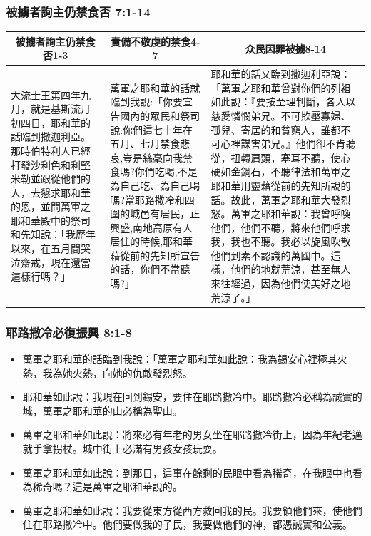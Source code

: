 \subsubsection{被擄者詢主仍禁食否 7:1-14}
\begin{table}[H]
\centering
\begin{tabular}{p{4.25cm}|p{4.55cm}|p{8.2cm}}\hline\hline
\multicolumn{1}{c|}{被擄者詢主仍禁食否1-3}&\multicolumn{1}{c|}{責備不敬虔的禁食4-7}&\multicolumn{1}{c}{众民因罪被擄8-14}\\\hline
大流士王第四年九月，就是基斯流月初四日，耶和華的話臨到撒迦利亞。那時伯特利人已經打發沙利色和利堅米勒並跟從他們的人，去懇求耶和華的恩，並問萬軍之耶和華殿中的祭司和先知說：「我歷年以來，在五月間哭泣齋戒，現在還當這樣行嗎？」
&萬軍之耶和華的話就臨到我說:「你要宣告國內的眾民和祭司說:你們這七十年在五月、七月禁食悲哀,豈是絲毫向我禁食嗎?你們吃喝,不是為自己吃、為自己喝嗎?當耶路撒冷和四圍的城邑有居民，正興盛,南地高原有人居住的時候,耶和華藉從前的先知所宣告的話，你們不當聽嗎?」
&耶和華的話又臨到撒迦利亞說：「萬軍之耶和華曾對你們的列祖如此說：『要按至理判斷，各人以慈愛憐憫弟兄。不可欺壓寡婦、孤兒、寄居的和貧窮人，誰都不可心裡謀害弟兄。』他們卻不肯聽從，扭轉肩頭，塞耳不聽，使心硬如金鋼石，不聽律法和萬軍之耶和華用靈藉從前的先知所說的話。故此，萬軍之耶和華大發烈怒。萬軍之耶和華說：我曾呼喚他們，他們不聽，將來他們呼求我，我也不聽。我必以旋風吹散他們到素不認識的萬國中。這樣，他們的地就荒涼，甚至無人來往經過，因為他們使美好之地荒涼了。」\\\hline
\end{tabular}
\end{table}


\subsubsection{耶路撒冷必復振興 8:1-8}
\begin{itemize} 
\itemsep-.5em 
\item 萬軍之耶和華的話臨到我說：「萬軍之耶和華如此說：我為錫安心裡極其火熱，我為她火熱，向她的仇敵發烈怒。
\item 耶和華如此說：我現在回到錫安，要住在耶路撒冷中。耶路撒冷必稱為誠實的城，萬軍之耶和華的山必稱為聖山。
\item 萬軍之耶和華如此說：將來必有年老的男女坐在耶路撒冷街上，因為年紀老邁就手拿拐杖。城中街上必滿有男孩女孩玩耍。
\item 萬軍之耶和華如此說：到那日，這事在餘剩的民眼中看為稀奇，在我眼中也看為稀奇嗎？這是萬軍之耶和華說的。
\item 萬軍之耶和華如此說：我要從東方從西方救回我的民。我要領他們來，使他們住在耶路撒冷中。他們要做我的子民，我要做他們的神，都憑誠實和公義。
\end{itemize}

